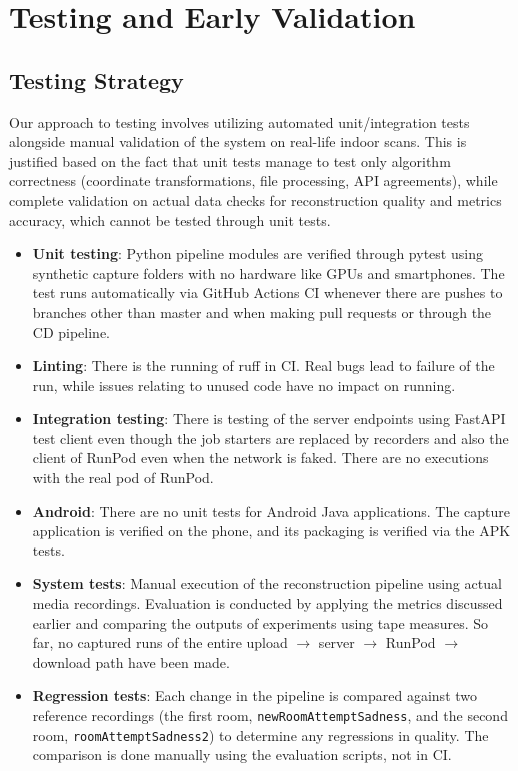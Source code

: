\chapter{Testing and Early Validation}
\label{ch:testing}

\section{Testing Strategy}
Our approach to testing involves utilizing automated unit/integration tests alongside manual validation of the system on real-life indoor scans. This is justified based on the fact that unit tests manage to test only algorithm correctness (coordinate transformations, file processing, API agreements), while complete validation on actual data checks for reconstruction quality and metrics accuracy, which cannot be tested through unit tests.

\begin{itemize}
    \item \textbf{Unit testing}: Python pipeline modules are verified through pytest using synthetic capture folders with no hardware like GPUs and smartphones. The test runs automatically via GitHub Actions CI whenever there are pushes to branches other than master and when making pull requests or through the CD pipeline.
    \item \textbf{Linting}: There is the running of ruff in CI. Real bugs lead to failure of the run, while issues relating to unused code have no impact on running.
    \item \textbf{Integration testing}: There is testing of the server endpoints using FastAPI test client even though the job starters are replaced by recorders and also the client of RunPod even when the network is faked. There are no executions with the real pod of RunPod.
    \item \textbf{Android}: There are no unit tests for Android Java applications. The capture application is verified on the phone, and its packaging is verified via the APK tests.
    \item \textbf{System tests}: Manual execution of the reconstruction pipeline using actual media recordings. Evaluation is conducted by applying the metrics discussed earlier and comparing the outputs of experiments using tape measures. So far, no captured runs of the entire upload $\rightarrow$ server $\rightarrow$ RunPod $\rightarrow$ download path have been made.
    \item \textbf{Regression tests}: Each change in the pipeline is compared against two reference recordings (the first room, \texttt{newRoomAttemptSadness}, and the second room, \texttt{roomAttemptSadness2}) to determine any regressions in quality. The comparison is done manually using the evaluation scripts, not in CI.
\end{itemize}

